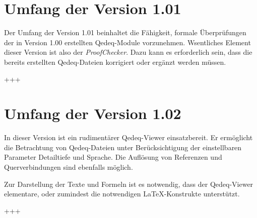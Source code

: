 \documentclass[a4paper,german,10pt,twoside]{book}
\begin{document}
{%

\section{Umfang der Version 1.01}
Der Umfang der Version 1.01 beinhaltet die F{\"a}higkeit, formale {\"U}berpr{\"u}fungen der in Version 1.00
erstellten Qedeq-Module vorzunehmen. Wsentliches Element dieser Version ist also der
\emph{ProofChecker}. Dazu kann es erforderlich sein, dass die bereits erstellten Qedeq-Dateien
korrigiert oder erg{\"a}nzt werden m{\"u}ssen.
\par
+++

\section{Umfang der Version 1.02}
In dieser Version ist ein rudiment{\"a}rer Qedeq-Viewer einsatzbereit. Er erm{\"o}glicht die Betrachtung
von Qedeq-Dateien unter Ber{\"u}cksichtigung der einstellbaren Parameter Detailtiefe und Sprache. Die
Aufl{\"o}sung von Referenzen und Querverbindungen sind ebenfalls m{\"o}glich.
\par
Zur Darstellung der Texte und Formeln ist es notwendig, dass der Qedeq-Viewer elementare, oder
zumindest die notwendigen \LaTeX-Konstrukte unterst{\"u}tzt.
\par
+++

}
\end{document}
